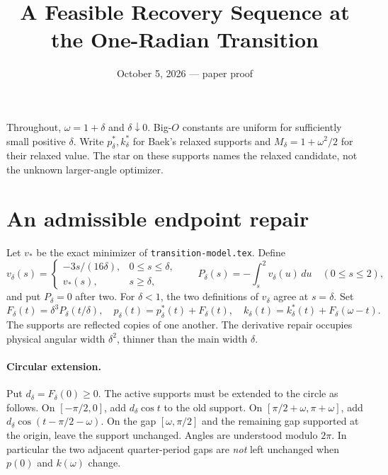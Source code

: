 \documentclass[11pt]{article}
\title{A Feasible Recovery Sequence at the One-Radian Transition}
\author{}\date{October 5, 2026 --- paper proof}
\begin{document}
\maketitle
Throughout, $\omega=1+\delta$ and $\delta\downarrow0$. Big-$O$ constants are uniform for sufficiently small positive $\delta$. Write $p_\delta^*,k_\delta^*$ for Baek's relaxed supports and $M_\delta=1+\omega^2/2$ for their relaxed value. The star on these supports names the relaxed candidate, not the unknown larger-angle optimizer.

\section*{An admissible endpoint repair}
Let $v_*$ be the exact minimizer of \texttt{transition-model.tex}. Define
\[
 v_\delta(s)=\begin{cases}
 -3s/(16\delta),&0\le s\le\delta,\\
 v_*(s),&s\ge\delta,
 \end{cases}\qquad
 P_\delta(s)=-\int_s^2v_\delta(u)\,du\quad(0\le s\le2),
\]
and put $P_\delta=0$ after two. For $\delta<1$, the two definitions of $v_\delta$ agree at $s=\delta$. Set
\[
 F_\delta(t)=\delta^3P_\delta(t/\delta),\quad
 p_\delta(t)=p_\delta^*(t)+F_\delta(t),\quad
 k_\delta(t)=k_\delta^*(t)+F_\delta(\omega-t).
\]
The supports are reflected copies of one another. The derivative repair occupies physical angular width $\delta^2$, thinner than the main width $\delta$.

\paragraph{Circular extension.}
Put $d_\delta=F_\delta(0)\ge0$. The active supports must be extended to the circle as follows. On $[-\pi/2,0]$, add $d_\delta\cos t$ to the old support. On $[\pi/2+\omega,\pi+\omega]$, add $d_\delta\cos(t-\pi/2-\omega)$. On the gap $[\omega,\pi/2]$ and the remaining gap supported at the origin, leave the support unchanged. Angles are understood modulo $2\pi$. In particular the two adjacent quarter-period gaps are \emph{not} left unchanged when $p(0)$ and $k(\omega)$ change.
\end{document}
